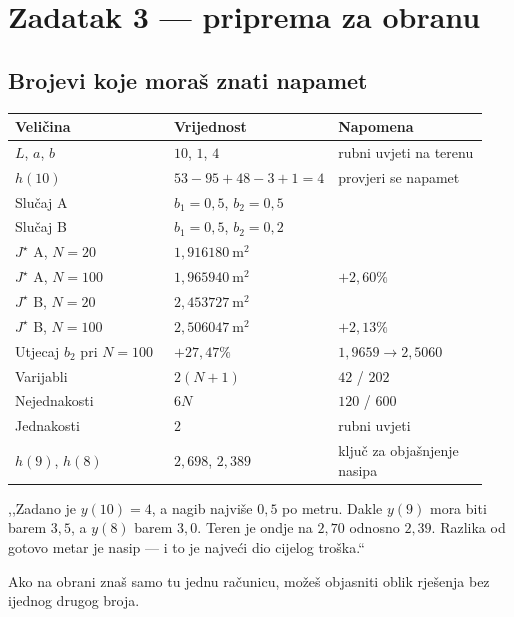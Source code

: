 \chapter{Zadatak 3 --- priprema za obranu}
\label{ch:z3-obrana}

\section{Brojevi koje moraš znati napamet}
\label{sec:z3o-brojevi}

\begin{longtable}{@{}p{0.34\linewidth} p{0.28\linewidth} p{0.32\linewidth}@{}}
\toprule
\textbf{Veličina} & \textbf{Vrijednost} & \textbf{Napomena} \\
\midrule
\endhead
$L$, $a$, $b$ & $10$, $1$, $4$ & rubni uvjeti na terenu \\
$h(10)$ & $53 - 95 + 48 - 3 + 1 = 4$ & provjeri se napamet \\
Slučaj A & $b_1 = 0{,}5$, $b_2 = 0{,}5$ & \\
Slučaj B & $b_1 = 0{,}5$, $b_2 = 0{,}2$ & \\
$J^{\star}$ A, $N = 20$ & $1{,}916180\ \mathrm{m}^2$ & \\
$J^{\star}$ A, $N = 100$ & $1{,}965940\ \mathrm{m}^2$ & $+2{,}60\%$ \\
$J^{\star}$ B, $N = 20$ & $2{,}453727\ \mathrm{m}^2$ & \\
$J^{\star}$ B, $N = 100$ & $2{,}506047\ \mathrm{m}^2$ & $+2{,}13\%$ \\
Utjecaj $b_2$ pri $N = 100$ & $+27{,}47\%$ & $1{,}9659 \to 2{,}5060$ \\
Varijabli & $2(N+1)$ & $42$ / $202$ \\
Nejednakosti & $6N$ & $120$ / $600$ \\
Jednakosti & $2$ & rubni uvjeti \\
$h(9)$, $h(8)$ & $2{,}698$, $2{,}389$ & ključ za objašnjenje nasipa \\
\bottomrule
\end{longtable}

\begin{izgovor}
,,Zadano je $y(10) = 4$, a nagib najviše $0{,}5$ po metru. Dakle $y(9)$ mora biti
barem $3{,}5$, a $y(8)$ barem $3{,}0$. Teren je ondje na $2{,}70$ odnosno
$2{,}39$. Razlika od gotovo metar je nasip --- i to je najveći dio cijelog
troška.``

Ako na obrani znaš samo tu jednu računicu, možeš objasniti oblik rješenja bez
ijednog drugog broja.
\end{izgovor}

